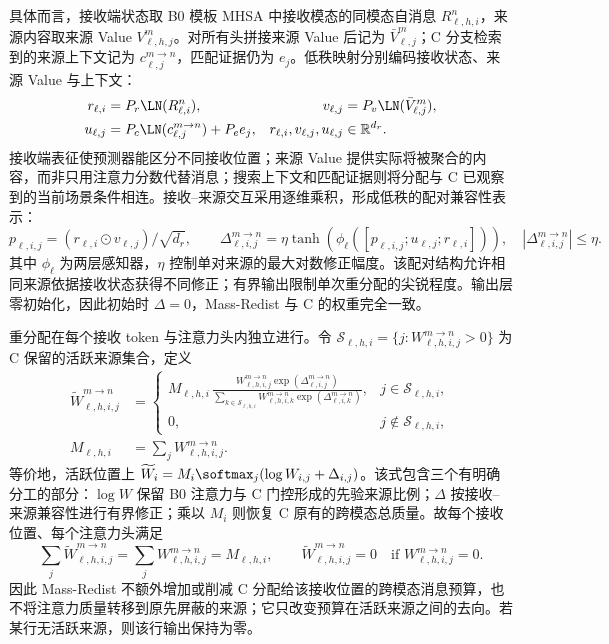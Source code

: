 具体而言，接收端状态取 B0 模板 MHSA 中接收模态的同模态自消息 $R_{\ell,h,i}^{n}$，来源内容取来源 Value $V_{\ell,h,j}^{m}$。对所有头拼接来源 Value 后记为 $\bar V_{\ell,j}^{m}$；C 分支检索到的来源上下文记为 $c_{\ell,j}^{m\to n}$，匹配证据仍为 $e_j$。低秩映射分别编码接收状态、来源 Value 与上下文：
\begin{align}
 r_{\ell,i}&=P_r\LN(R_{\ell,i}^{n}), &
 v_{\ell,j}&=P_v\LN(\bar V_{\ell,j}^{m}),\\
 u_{\ell,j}&=P_c\LN(c_{\ell,j}^{m\to n})+P_e e_j,
 &r_{\ell,i},v_{\ell,j},u_{\ell,j}&\in\mathbb R^{d_r}.
 \label{eq:mr-projections}
\end{align}
接收端表征使预测器能区分不同接收位置；来源 Value 提供实际将被聚合的内容，而非只用注意力分数代替消息；搜索上下文和匹配证据则将分配与 C 已观察到的当前场景条件相连。接收--来源交互采用逐维乘积，形成低秩的配对兼容性表示：
\begin{equation}
 p_{\ell,i,j}=\left(r_{\ell,i}\odot v_{\ell,j}\right)/\sqrt{d_r},
 \qquad
 \Delta_{\ell,i,j}^{m\to n}
 =\eta\tanh\!\left(\phi_\ell([p_{\ell,i,j};u_{\ell,j};r_{\ell,i}])\right),
 \quad |\Delta_{\ell,i,j}^{m\to n}|\le\eta.
 \label{eq:mr-delta}
\end{equation}
其中 $\phi_\ell$ 为两层感知器，$\eta$ 控制单对来源的最大对数修正幅度。该配对结构允许相同来源依据接收状态获得不同修正；有界输出限制单次重分配的尖锐程度。输出层零初始化，因此初始时 $\Delta=0$，Mass-Redist 与 C 的权重完全一致。

重分配在每个接收 token 与注意力头内独立进行。令 $\mathcal S_{\ell,h,i}=\{j:W_{\ell,h,i,j}^{m\to n}>0\}$ 为 C 保留的活跃来源集合，定义
\begin{align}
 \widetilde W_{\ell,h,i,j}^{m\to n}
 &=\begin{cases}
 \displaystyle M_{\ell,h,i}\,
 \frac{W_{\ell,h,i,j}^{m\to n}
 \exp(\Delta_{\ell,i,j}^{m\to n})}
 {\sum_{k\in\mathcal S_{\ell,h,i}}
 W_{\ell,h,i,k}^{m\to n}
 \exp(\Delta_{\ell,i,k}^{m\to n})}, &j\in\mathcal S_{\ell,h,i},\\[1.2ex]
 0,&j\notin\mathcal S_{\ell,h,i},
 \end{cases}\\
 M_{\ell,h,i}&=\sum_j W_{\ell,h,i,j}^{m\to n}.
 \label{eq:mr-redistribute}
\end{align}
等价地，活跃位置上 $\widetilde W_i=M_i\softmax_j(\log W_{i,j}+\Delta_{i,j})$。该式包含三个有明确分工的部分：$\log W$ 保留 B0 注意力与 C 门控形成的先验来源比例；$\Delta$ 按接收--来源兼容性进行有界修正；乘以 $M_i$ 则恢复 C 原有的跨模态总质量。故每个接收位置、每个注意力头满足
\begin{equation}
 \sum_j\widetilde W_{\ell,h,i,j}^{m\to n}
 =\sum_j W_{\ell,h,i,j}^{m\to n}=M_{\ell,h,i},
 \qquad
 \widetilde W_{\ell,h,i,j}^{m\to n}=0\quad\text{if }W_{\ell,h,i,j}^{m\to n}=0.
 \label{eq:mr-conservation}
\end{equation}
因此 Mass-Redist 不额外增加或削减 C 分配给该接收位置的跨模态消息预算，也不将注意力质量转移到原先屏蔽的来源；它只改变预算在活跃来源之间的去向。若某行无活跃来源，则该行输出保持为零。

